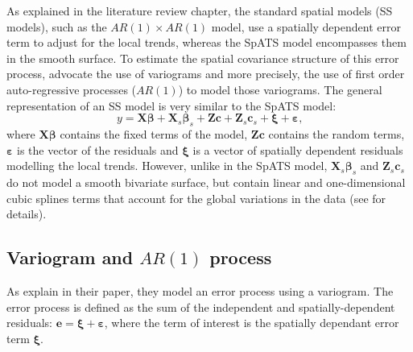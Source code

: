 As explained in the literature review chapter, the standard spatial models (SS models), such as the $AR(1) \times AR(1)$ model, use a spatially dependent error term to adjust for the local trends, whereas the SpATS model encompasses them in the smooth surface. 
To estimate the spatial covariance structure of this error process, \textcite{gilmour_accounting_1997} advocate the use of variograms and more precisely, the use of first order auto-regressive processes ($AR(1)$) to model those variograms. 
The general representation of an SS model is very similar to the SpATS model:
\begin{equation}
	y = \mathbf{X}\boldsymbol{\beta} + \mathbf{X}_{s}\boldsymbol{\beta}_{s} + \mathbf{Zc} +  \mathbf{Z}_{s}\mathbf{c}_{s} + 
	\boldsymbol{\xi} + \boldsymbol{\varepsilon}
	\text{,}
	\label{eq:standard_spatial_model}
\end{equation}
where $\mathbf{X}\boldsymbol{\beta}$ contains the fixed terms of the model, $\mathbf{Zc}$ contains the random terms, $\boldsymbol{\varepsilon}$ is the vector of the residuals and $\boldsymbol{\xi}$ is a vector of spatially dependent residuals modelling the local trends. However, unlike in the SpATS model, $\mathbf{X}_{s}\boldsymbol{\beta}_{s}$ and $\mathbf{Z}_{s}\mathbf{c}_{s}$ do not model a smooth bivariate surface, but contain linear and one-dimensional cubic splines terms that account for the global variations in the data (see \textcite{verbyla_analysis_1999} for details).\\

\subsection{Variogram and $AR(1)$ process}
As \textcite{gilmour_accounting_1997} explain in their paper, they model an error process using a variogram. The error process is defined as the sum of the independent and spatially-dependent residuals: $\mathbf{e} = \boldsymbol{\xi} + \boldsymbol{\varepsilon}$, where the term of interest is the spatially dependant error term $\boldsymbol{\xi}$.\\

